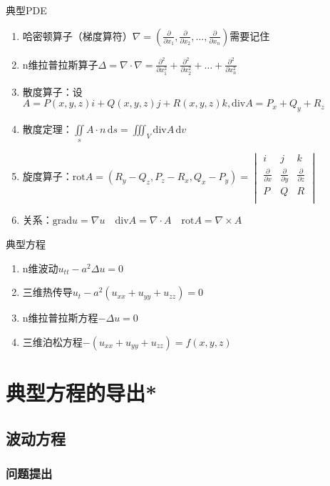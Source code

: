 典型PDE
\begin{enumerate}
	\item 哈密顿算子（梯度算符）\(\nabla=\left(\frac{\partial}{\partial x_1},\frac{\partial}{\partial x_2},\ldots,\frac{\partial}{\partial x_n}\right)\)需要记住
	\item n维拉普拉斯算子\(\Delta=\nabla\cdot\nabla=\frac{\partial^2}{\partial x_1^2}+\frac{\partial^2}{\partial x_2^2}+\ldots+\frac{\partial^2}{\partial x_n^2}\)
	\item 散度算子：设\(A=P(x,y,z)i+Q(x,y,z)j+R(x,y,z)k,\mathrm{div}A=P_x+Q_y+R_z\)
	\item 散度定理：\(\iint\limits_s A\cdot n\,\mathrm{d}s=\iiint_{V}\mathrm{div}A\,\mathrm{d}v\)
	\item 旋度算子：\(\mathrm{rot}A=\left(R_y-Q_z,P_z-R_x,Q_x-P_y\right)=
	\begin{vmatrix}
		i&j&k\\
		\frac{\partial}{\partial x}&\frac{\partial}{\partial y}&\frac{\partial}{\partial z}\\
		P&Q&R\\
	\end{vmatrix}\)
	\item 关系：\(\mathrm{grad}u=\nabla u\quad\mathrm{div}A=\nabla\cdot A\quad\mathrm{rot}A=\nabla\times A\)

\end{enumerate}

典型方程
\begin{enumerate}
	\item n维波动\(u_{tt}-a^2\Delta u=0\)
	\item 三维热传导\(u_t-a^2\left(u_{xx}+u_{yy}+u_{zz}\right)=0\)
	\item n维拉普拉斯方程\(-\Delta u=0\)
	\item 三维泊松方程\(-\left(u_{xx}+u_{yy}+u_{zz}\right)=f(x,y,z)\)
\end{enumerate}

\section{典型方程的导出*}

\subsection{波动方程}

\subsubsection{问题提出}

